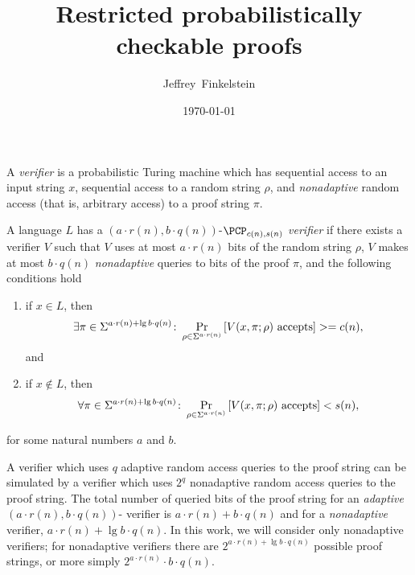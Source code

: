 \documentclass[draft]{article}
\title{Restricted probabilistically checkable proofs}
\author{Jef{}frey~Finkelstein}
\date{\today}
\begin{document}
\maketitle

\begin{definition}
  A \emph{\PCP{} verifier} is a probabilistic Turing machine which has sequential access to an input string $x$, sequential access to a random string $\rho$, and \emph{nonadaptive} random access (that is, arbitrary access) to a proof string $\pi$.
\end{definition}

\begin{definition}
  A language $L$ has a $(a \cdot r(n), b \cdot q(n))$-\emph{$\PCP_{c(n), s(n)}$ verifier} if there exists a \PCP{} verifier $V$ such that $V$ uses at most $a \cdot r(n)$ bits of the random string $\rho$, $V$ makes at most $b \cdot q(n)$ \emph{nonadaptive} queries to bits of the proof $\pi$, and the following conditions hold
  \begin{enumerate}
  \item if $x \in L$, then 
    \begin{equation*}
      \exists \pi \in \Sigma^{a \cdot r(n) + \lg{b \cdot q(n)}} \colon \Pr_{\rho \in \Sigma^{a \cdot r(n)}}{\left[V(x, \pi; \rho) \textnormal{ accepts}\right]} >= c(n),
    \end{equation*}
    and
  \item if $x \notin L$, then
    \begin{equation*}
      \forall \pi \in \Sigma^{a \cdot r(n) + \lg{b \cdot q(n)}} \colon \Pr_{\rho \in \Sigma^{a \cdot r(n)}}{\left[V(x, \pi; \rho) \textnormal{ accepts}\right]} < s(n),
    \end{equation*}
  \end{enumerate}
  for some natural numbers $a$ and $b$.
\end{definition}

A verifier which uses $q$ adaptive random access queries to the proof string can be simulated by a verifier which uses $2^q$ nonadaptive random access queries to the proof string.
The total number of queried bits of the proof string for an \emph{adaptive} $(a \cdot r(n), b \cdot q(n))$-\PCP{} verifier is $a \cdot r(n) + b \cdot q(n)$ and for a \emph{nonadaptive} \PCP{} verifier, $a \cdot r(n) + \lg{b \cdot q(n)}$.
In this work, we will consider only nonadaptive \PCP{} verifiers; for nonadaptive \PCP{} verifiers there are $2^{a \cdot r(n) + \lg{b \cdot q(n)}}$ possible proof strings, or more simply $2^{a \cdot r(n)} \cdot b \cdot q(n)$.
\end{document}
